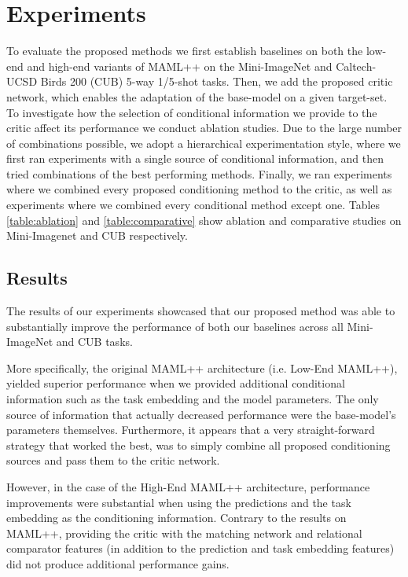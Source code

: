 \documentclass{article} \usepackage[dvipsnames]{xcolor}
\begin{document}
\section{Experiments}\label{section:experiments}
To evaluate the proposed methods we first establish baselines on both the low-end and high-end variants of MAML++ on the Mini-ImageNet and Caltech-UCSD Birds 200 (CUB) 5-way 1/5-shot tasks. Then, we add the proposed critic network, which enables the adaptation of the base-model on a given target-set. To investigate how the selection of conditional information we provide to the critic affect its performance we conduct ablation studies. Due to the large number of combinations possible, we adopt a hierarchical experimentation style, where we first ran experiments with a single source of conditional information, and then tried combinations of the best performing methods. Finally, we ran experiments where we combined every proposed conditioning method to the critic, as well as experiments where we combined every conditional method except one. Tables \ref{table:ablation} and \ref{table:comparative} show ablation and comparative studies on Mini-Imagenet and CUB respectively.
\subsection{Results}
The results of our experiments showcased that our proposed method was able to substantially improve the performance of both our baselines across all Mini-ImageNet and CUB tasks. 

More specifically, the original MAML++ architecture (i.e. Low-End MAML++), yielded superior performance when we provided additional conditional information such as the task embedding and the model parameters. The only source of information that actually decreased performance were the base-model's parameters themselves. Furthermore, it appears that a very straight-forward strategy that worked the best, was to simply combine all proposed conditioning sources and pass them to the critic network.

However, in the case of the High-End MAML++ architecture, performance improvements were substantial when using the predictions and the task embedding as the conditioning information. Contrary to the results on MAML++, providing the critic with the matching network and relational comparator features (in addition to the prediction and task embedding features) did not produce additional performance gains.
\end{document}
